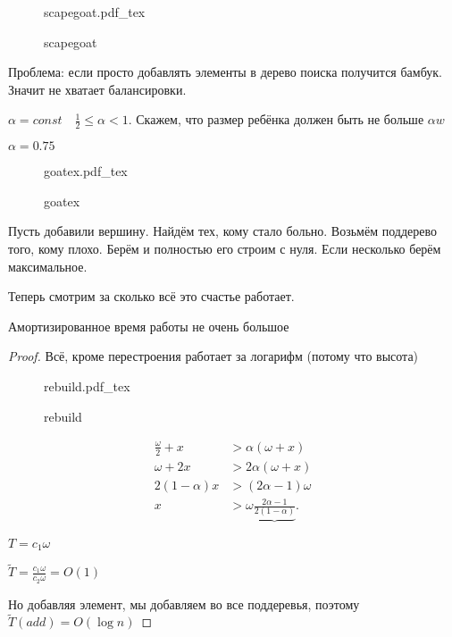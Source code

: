 \documentclass{book}
\theoremstyle{definition}
\newcommand{\tl}[1]{\widetilde{#1}}
\newcommand{\incfig}[1]{%
    \def\svgwidth{\columnwidth}
    {#1.pdf_tex}
}
\begin{document}
\begin{figure}[!ht]
    \centering
    \incfig{scapegoat}
    \caption{scapegoat}
    \label{fig:scapegoat}
\end{figure}


Проблема: если просто добавлять элементы в дерево поиска получится бамбук. Значит не хватает балансировки.


$\alpha = const\quad \frac{1}{2} \leqslant \alpha <1$. Скажем, что размер ребёнка должен быть не больше $\alpha w$

 $\alpha = 0.75$

\begin{figure}[!ht]
    \centering
    \incfig{goatex}
    \caption{goatex}
    \label{fig:goatex}
\end{figure}

Пусть добавили вершину. Найдём тех, кому стало больно. Возьмём поддерево того, кому плохо. Берём и полностью его строим с нуля. Если несколько берём максимальное.

Теперь смотрим за сколько всё это счастье работает.
\begin{statement}
    Амортизированное время работы не очень большое
\end{statement}
\begin{proof}
    Всё, кроме перестроения работает за логарифм (потому что высота)

\begin{figure}[!ht]
    \centering
    \incfig{rebuild}
    \caption{rebuild}
    \label{fig:rebuild}
\end{figure}
\begin{align*}
     \frac{\omega}{2} + x &> \alpha\left( \omega + x \right) \\
     \omega + 2x &> 2\alpha\left( \omega + x \right) \\
     2\left( 1-\alpha \right) x&>\left( 2\alpha-1 \right) \omega\\
     x &>\omega \underbrace{\frac{2\alpha-1}{2(1-\alpha)}}
.\end{align*}

$T = c_1\omega$

$\tl T = \frac{c_1\omega}{c_2\omega} = O(1)$

Но добавляя элемент, мы добавляем во все поддеревья, поэтому $\tl T(add) = O\left( \log n \right) $
\end{proof}
\end{document}
